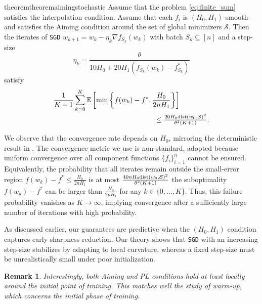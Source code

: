 \documentclass[a4paper,11pt]{article}
\newcommand{\algname}[1]{\texttt{#1}}
\newcommand{\E}[1]{\mathbb{E}\left[#1\right]}
\newcommand{\cS}{\mathcal{S}}
\newcommand{\1}{\mathbbm{1}}
\theoremstyle{plain}
\newtheorem{theorem}{Theorem}[section]
\newtheorem{remark}{Remark}[section]
\begin{document}
\begin{restatable}{theorem}{theoremaimingstochastic}\label{th:adaptive_aiming_stochastic}
    Assume that the problem \eqref{eq:finite_sum} satisfies the interpolation condition. Assume that each $f_i$ is $(H_0,H_1)$-smooth and satisfies the Aiming condition around the set of global minimizers $\cS.$ Then the iterates of \algname{SGD} $w_{k+1} = w_k - \eta_k\nabla f_{S_k}(w_k)$ with batch $S_k\subseteq [n]$ and a step-size 
    $$\eta_k = \frac{\theta}{10H_0+20H_1(f_{S_k}(w_k)-f_{S_k}^*)}$$ satisfy 
    \begin{align*}
         &\frac{1}{K+1}\sum_{k=0}^{K}\E{\min\left\{f(w_k)-f^*, \frac{H_0}{2n H_1}\right\}}\\ 
         &\hspace{5cm}\le \tfrac{20H_0{\rm dist}(w_0,\cS)^2}{\theta^2(K+1)}.
    \end{align*}
\end{restatable}
We observe that the convergence rate depends on $H_0$, mirroring the deterministic result in . The convergence metric we use is non-standard, adopted because uniform convergence over all component functions $\{f_i\}_{i=1}^n$ cannot be ensured. Equivalently, the probability that all iterates remain outside the small-error region $f(w_k) -f^* \le \frac{H_0}{2nH_1}$ is at most $\frac{40nH_0{\rm dist}(w_0,\cS)^2}{\theta^2(K+1)}$ the suboptimality $f(w_k)-f^*$ can be larger than $\frac{H_0}{2nH_1}$ for any $k\in\{0,\dots, K\}.$ Thus, this failure probability vanishes as $K\to \infty$, implying convergence after a sufficiently large number of iterations with high probability.


As discussed earlier, our guarantees are predictive when the $(H_0,H_1)$ condition captures early sharpness reduction. Our theory shows that \algname{SGD} with an increasing step-size stabilizes by adapting to local curvature, whereas a fixed step-size must be unrealistically small under poor initialization.

\begin{remark}
    Interestingly, both Aiming \citep{liu2023aiming} and PL \cite{liu2022loss} conditions hold at least locally around the initial point of training. This matches well the study of warm-up, which concerns the initial phase of training.
\end{remark}
 
\end{document}
